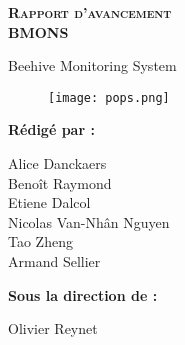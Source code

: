 
\begingroup
\thispagestyle{empty}
\begin{center}
\vspace*{2cm}
{\Huge \textsc{\textbf{Rapport d'avancement}}}\\
\vspace*{2cm}
{\Huge \textbf{BMONS}}\par %
\vspace*{2cm}
{\huge Beehive Monitoring System}\par %
\end{center}
\vspace*{4cm}

\begin{figure}[h!]
\centering\texttt{[image: pops.png]}
\end{figure}

\textbf{\large Rédigé par :} 

\begin{center}
{
\large
Alice Danckaers\\
Benoît Raymond\\
Etiene Dalcol\\
Nicolas Van-Nhân Nguyen\\
Tao Zheng\\
Armand Sellier\\
}
\end{center}

\vspace*{1cm}

{\large \textbf{Sous la direction de :}}\\
\begin{center}
{\large
Olivier Reynet\\
}
\end{center}
\endgroup
